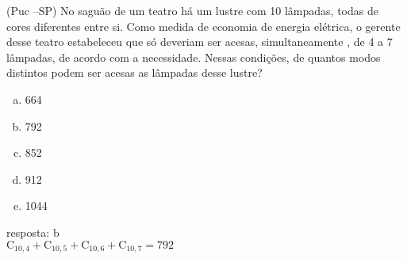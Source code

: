 \begin{ex}
(Puc –SP) No saguão de um teatro há um lustre com 10 lâmpadas, todas de cores diferentes entre si. Como medida de economia de energia elétrica, o gerente desse teatro estabeleceu que só deveriam ser acesas, simultaneamente , de 4 a 7 lâmpadas, de acordo com a necessidade. Nessas condições, de quantos modos distintos podem ser acesas as lâmpadas desse lustre?
   \begin{enumerate}[(a)]
   \item 664
   \item 792
   \item 852
   \item 912
   \item 1044
   \end{enumerate}
    \begin{sol}
     resposta: b \\
     $\mathrm{C}_{{10},4}+\mathrm{C}_{{10},5}+\mathrm{C}_{{10},6}+\mathrm{C}_{{10},7}=792$
    \end{sol}
\end{ex}